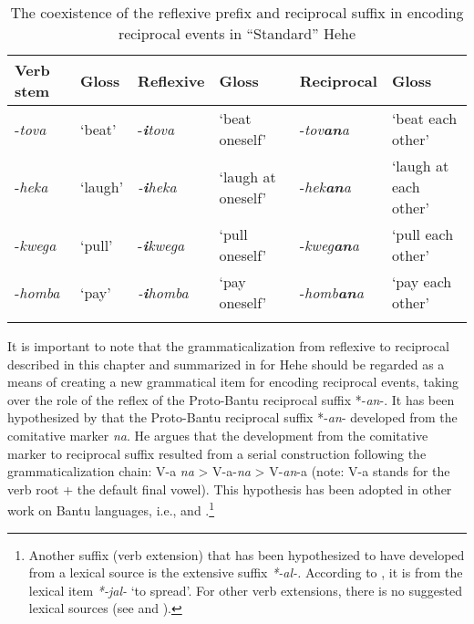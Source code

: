 \documentclass[output=paper,
            colorlinks, citecolor=brown
            ,draftmode
		  ]{langscibook}
\begin{document}
\begin{table}

\begin{tabularx}{\textwidth}{lllQlQ}

\lsptoprule

Verb stem & Gloss & Reflexive & Gloss & Reciprocal & Gloss \\
\midrule
{}-\textit{tova} & ‘beat’ & {}-\textbf{\textit{i}}\textit{tova} & ‘beat oneself’ & {}-\textit{tov}\textbf{\textit{an}}\textit{a} & ‘beat each other’\\
{}-\textit{heka} & ‘laugh’ & {\itshape {}-\textbf{i}heka} & ‘laugh at oneself’ & {}-\textit{hek}\textbf{\textit{an}}\textit{a} & ‘laugh at each other’\\
{}-\textit{kwega} & ‘pull’ & {}-\textbf{\textit{i}}\textit{kwega} & ‘pull oneself’ & {}-\textit{kweg}\textbf{\textit{an}}\textit{a} & ‘pull each other’\\
{}-\textit{homba} & ‘pay’ & {\itshape {}-\textbf{i}homba} & ‘pay oneself’ & {}-\textit{homb}\textbf{\textit{an}}\textit{a} & ‘pay each other’\\
\lspbottomrule
\end{tabularx}
\caption{The coexistence of the reflexive prefix and reciprocal suffix in encoding reciprocal events in ``Standard'' Hehe \citep[59]{Msamba2013}}
\label{tab:ngwasi:3}
\end{table}

It is important to note that the grammaticalization from reflexive to reciprocal described in this chapter and summarized in  for Hehe should be regarded as a means of creating a new grammatical item for encoding reciprocal events, taking over the role of the reflex of the Proto\nobreakdash-Bantu reciprocal suffix *-\textit{an}{}-. It has been hypothesized by \citet{Schladt1998} that the Proto\nobreakdash-Bantu reciprocal suffix *-\textit{an}{}- developed from the comitative marker \textit{na}.  He argues that the development from the comitative marker to reciprocal suffix resulted from a serial construction following the grammaticalization chain: V-a \textit{na} > V-a-\textit{na} > V-\textit{an}{}-a (note: V-a stands for the verb root + the default final vowel). This hypothesis has been adopted in other work on Bantu  languages, i.e.,  \citet{SchadebergBostoen2019} and \citet{BostoenEtAl2015}.\footnote{Another suffix (verb extension) that has been hypothesized to have developed from a lexical source is the extensive suffix \textit{*-al-.} According to  \citet{Schadeberg2003}, it is from the lexical item \textit{*-jal-} ‘to spread’. For other verb extensions, there is no suggested lexical sources (see  \citealt{Schadeberg2003} and \citealt[174]{SchadebergBostoen2019}).}
\end{document}
